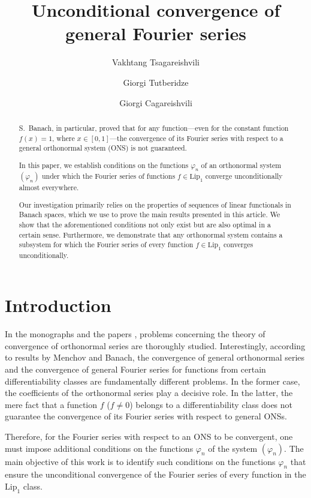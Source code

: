 \documentclass{publmathdeb}
\author{Vakhtang Tsagareishvili}
\author{Giorgi Tutberidze}
\author{Giorgi Cagareishvili}
\title[Unconditional convergence]{Unconditional convergence of general Fourier series}
\begin{document}
	
	\begin{abstract}
		S.~Banach, in particular, proved that for any function---even for the constant function \( f(x) = 1 \), where \( x \in [0,1] \)---the convergence of its Fourier series with respect to a general orthonormal system (ONS) is not guaranteed.
		
		In this paper, we establish conditions on the functions \( \varphi_n \) of an orthonormal system \( (\varphi_n) \) under which the Fourier series of functions \( f \in \mathrm{Lip}_1 \) converge unconditionally almost everywhere.
		
		Our investigation primarily relies on the properties of sequences of linear functionals in Banach spaces, which we use to prove the main results presented in this article. We show that the aforementioned conditions not only exist but are also optimal in a certain sense. Furthermore, we demonstrate that any orthonormal system contains a subsystem for which the Fourier series of every function \( f \in \mathrm{Lip}_1 \) converges unconditionally.
	\end{abstract}
	
	\maketitle
	
		
	\section{Introduction}
	In the monographs \cite{Alexits, KaczmarzSteinhaus, KashinSaakyan} and the papers \cite{Olevskii, Orlicz, Rademacher, Tandori}, problems concerning the theory of convergence of orthonormal series are thoroughly studied. Interestingly, according to results by Menchov and Banach, the convergence of general orthonormal series and the convergence of general Fourier series for functions from certain differentiability classes are fundamentally different problems. In the former case, the coefficients of the orthonormal series play a decisive role. In the latter, the mere fact that a function \( f \) (\( f \ne 0 \)) belongs to a differentiability class does not guarantee the convergence of its Fourier series with respect to general ONSs.
	
	Therefore, for the Fourier series with respect to an ONS to be convergent, one must impose additional conditions on the functions \( \varphi_n \) of the system \( (\varphi_n) \). The main objective of this work is to identify such conditions on the functions \( \varphi_n \) that ensure the unconditional convergence of the Fourier series of every function in the \( \mathrm{Lip}_1 \) class.
	
\end{document}
